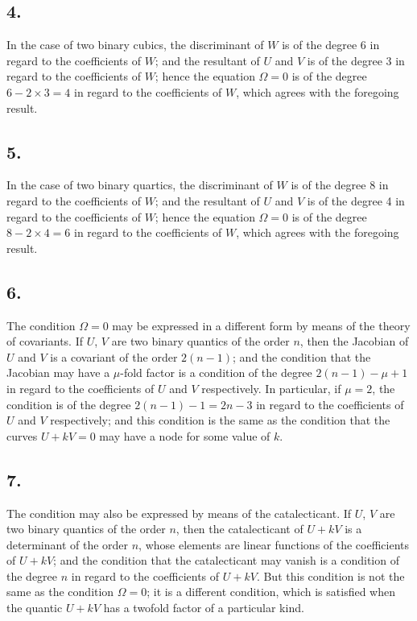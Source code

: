 \documentclass[11pt,a4paper]{article}
\theoremstyle{definition}
\begin{document}
\subsection*{4.}

In the case of two binary cubics, the discriminant of $W$ is of the degree 6 in regard
to the coefficients of $W$; and the resultant of $U$ and $V$ is of the degree 3 in regard to
the coefficients of $W$; hence the equation $\Omega = 0$ is of the degree $6 - 2 \times 3 = 4$ in regard
to the coefficients of $W$, which agrees with the foregoing result.

\subsection*{5.}

In the case of two binary quartics, the discriminant of $W$ is of the degree 8 in regard
to the coefficients of $W$; and the resultant of $U$ and $V$ is of the degree 4 in regard to
the coefficients of $W$; hence the equation $\Omega = 0$ is of the degree $8 - 2 \times 4 = 6$ in regard
to the coefficients of $W$, which agrees with the foregoing result.

\newpage
\subsection*{6.}

The condition $\Omega = 0$ may be expressed in a different form by means of the theory of
covariants. If $U$, $V$ are two binary quantics of the order $n$, then the Jacobian of $U$ and
$V$ is a covariant of the order $2(n - 1)$; and the condition that the Jacobian may have a
$\mu$-fold factor is a condition of the degree $2(n - 1) - \mu + 1$ in regard to the coefficients
of $U$ and $V$ respectively. In particular, if $\mu = 2$, the condition is of the degree $2(n - 1) - 1 = 2n - 3$
in regard to the coefficients of $U$ and $V$ respectively; and this condition is the same as
the condition that the curves $U + kV = 0$ may have a node for some value of $k$.

\subsection*{7.}

The condition may also be expressed by means of the catalecticant. If $U$, $V$ are two
binary quantics of the order $n$, then the catalecticant of $U + kV$ is a determinant of the
order $n$, whose elements are linear functions of the coefficients of $U + kV$; and the condition
that the catalecticant may vanish is a condition of the degree $n$ in regard to the coefficients
of $U + kV$. But this condition is not the same as the condition $\Omega = 0$; it is a different
condition, which is satisfied when the quantic $U + kV$ has a twofold factor of a particular
kind.
\end{document}
